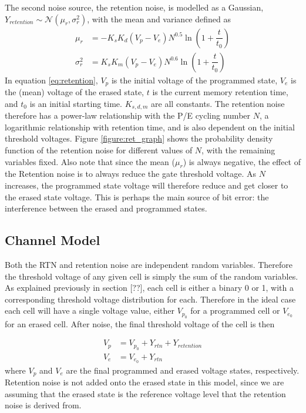 \documentclass[11pt]{article}
\numberwithin{equation}{subsection}
\begin{document}
The second noise source, the retention noise, is modelled as a Gaussian, $Y_{retention} \sim \mathcal{N}(\mu_r,\sigma_r^2)$, with the mean and variance defined as
\begin{equation} \label{eq:retention}
\begin{aligned}
\mu_r &= -K_sK_d(V_p-V_e)N^{0.5}\ln\left(1+\dfrac{t}{t_0}\right)\\
\sigma_r^2 &= K_sK_m(V_p-V_e)N^{0.6}\ln\left(1+\dfrac{t}{t_0}\right)
\end{aligned}
\end{equation}
In equation \ref{eq:retention}, $V_p$ is the initial voltage of the programmed state, $V_e$ is the (mean) voltage of the erased state, $t$ is the current memory retention time, and $t_0$ is an initial starting time. $K_{s,d,m}$ are all constants. The retention noise therefore has a power-law relationship with the P/E cycling number $N$, a logarithmic relationship with retention time, and is also dependent on the initial threshold voltages. Figure \ref{figure:ret_graph} shows the probability density function of the retention noise for different values of $N$, with the remaining variables fixed. Also note that since the mean ($\mu_r$) is always negative, the effect of the Retention noise is to always reduce the gate threshold voltage. As $N$ increases, the programmed state voltage will therefore reduce and get closer to the erased state voltage. This is perhaps the main source of bit error: the interference between the erased and programmed states. 

\subsection{Channel Model}
Both the RTN and retention noise are independent random variables. Therefore the threshold voltage of any given cell is simply the sum of the random variables. As explained previously in section [??], each cell is either a binary 0 or 1, with a corresponding threshold voltage distribution for each. Therefore in the ideal case each cell will have a single voltage value, either $V_{p_0}$ for a programmed cell or $V_{e_0}$ for an erased cell. After noise, the final threshold voltage of the cell is then

\begin{equation} \label{eq:additive_memory_noise_model}
\begin{aligned}
V_{p} &= V_{p_0} + Y_{rtn} + Y_{retention} \\
V_{e} &= V_{e_0} + Y_{rtn}
\end{aligned}
\end{equation}
where $V_{p}$ and $V_{e}$ are the final programmed and erased voltage states, respectively. Retention noise is not added onto the erased state in this model, since we are assuming that the erased state is the reference voltage level that the retention noise is derived from.
\bigskip
\end{document}
